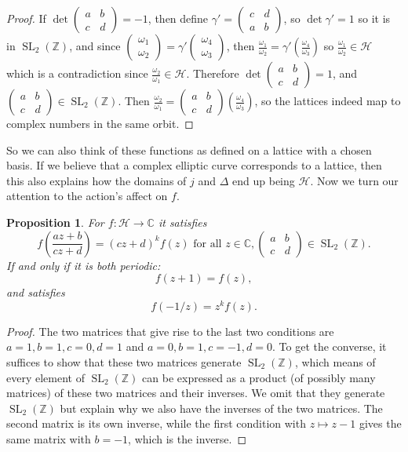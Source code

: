 \documentclass{article}
\newtheorem{prop}{Proposition}[section]
\theoremstyle{definition}
\theoremstyle{definition}
\theoremstyle{definition}
\newcommand{\SLZ}{\operatorname{SL}_2(\mathbb{Z})}
\newcommand{\SL}{\operatorname{SL}}
\newcommand{\Z}{\mathbb{Z}}
\newcommand{\Mabcd}{\begin{pmatrix} a&b\\c&d \end{pmatrix}}
\begin{document}
\begin{proof}
If $\det\Mabcd=-1$, then define $\gamma'=\begin{pmatrix}c&d\\a&b\end{pmatrix}$, so $\det\gamma'=1$ so it is in $\SLZ$, and since $\begin{pmatrix} \omega_1\\\omega_2 \end{pmatrix}=\gamma'\begin{pmatrix} \omega_4\\\omega_3 \end{pmatrix}$, then $\frac{\omega_1}{\omega_2}=\gamma'\left(\frac{\omega_4}{\omega_3}\right)$ so $\frac{\omega_1}{\omega_2}\in\mathcal H$ which is a contradiction since $\frac{\omega_2}{\omega_1}\in\mathcal H$. Therefore $\det\Mabcd=1$, and $\Mabcd\in\SLZ$. Then $\frac{\omega_2}{\omega_1}=\Mabcd\left(\frac{\omega_4}{\omega_3}\right)$, so the lattices indeed map to complex numbers in the same orbit.
\end{proof}

So we can also think of these functions as defined on a lattice with a chosen basis.
\newline\newline
If we believe that a complex elliptic curve corresponds to a lattice, then this also explains how the domains of $j$ and $\Delta$ end up being $\mathcal{H}$.
\newline\newline
Now we turn our attention to the action's affect on $f$.

\begin{prop}
    For $f:\mathcal{H}\rightarrow\mathbb{C}$ it satisfies
$$f\left(\frac{az+b}{cz+d}\right)=(cz+d)^kf(z)\text{ for all }z\in \mathbb{C}, \Mabcd\in\SL_2(\Z).$$
If and only if it is both periodic:
$$f(z+1)=f(z),$$
and satisfies
 $$f(-1/z)= z^kf(z).$$

\end{prop}


 \begin{proof}
      The two matrices that give rise to the last two conditions are $a=1,b=1,c=0,d=1$ and $a=0,b=1,c=-1,d=0$.
 \newline\newline     
      To get the converse, it suffices to show that these two matrices generate $\SLZ$, which means of every element of $\SL_2(\Z)$ can be expressed as a product (of possibly many matrices) of these two matrices and their inverses.
\newline\newline
      We omit that they generate $\SL_2(\Z)$ but explain why we also have the inverses of the two matrices. The second matrix is its own inverse, while the first condition with $z\mapsto z-1$ gives the same matrix with $b=-1$, which is the inverse.

      
 \end{proof}
\end{document}
